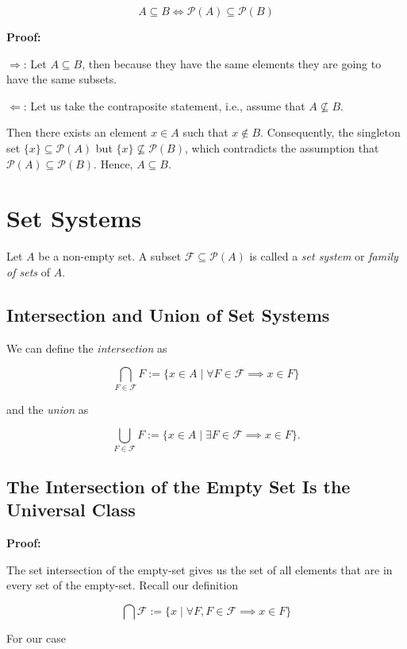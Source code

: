 \[
	A \subseteq B \iff \mathcal{P}(A) \subseteq \mathcal{P}(B)
\]

\textbf{Proof:}

\(\Rightarrow\): Let \(A \subseteq B\), then because they have the same elements they are going to have the same subsets.

\(\Leftarrow\): Let us take the contraposite statement, i.e., assume that \(A \not\subseteq B\).

Then there exists an element \(x \in A\) such that \(x \notin B\).  Consequently, the singleton set \(\{x\} \subseteq \mathcal{P}(A)\) but \(\{x\} \not\subseteq \mathcal{P}(B)\),
which contradicts the assumption that \(\mathcal{P}(A) \subseteq \mathcal{P}(B)\).  Hence, \(A \subseteq B\).

\QED

\section{Set Systems}

Let \(A\) be a non-empty set. A subset \(\mathscr{F} \subseteq \mathcal{P}(A)\)  is called a
\emph{set system} or \emph{family of sets} of \(A\).

\subsection{Intersection and Union of Set Systems}

We can define the \emph{intersection} as

\[
	\bigcap_{F \in \mathscr{F}} F  := \{x \in A \mid \forall F \in \mathscr{F} \implies x \in F\}
\]

and the \emph{union} as

\[
	\bigcup_{F \in \mathscr{F}} F  := \{x \in A \mid  \exists F \in \mathscr{F} \implies x \in F\}.
\]

\subsection{The Intersection of the Empty Set Is the Universal Class}

\textbf{Proof:}

The set intersection of the empty-set gives us the set of all elements that are in every set of the empty-set.
Recall our definition

\[
	\bigcap \mathscr{F}  := \{x \mid \forall F, F \in \mathscr{F} \implies x \in F\}
\]


For our case

